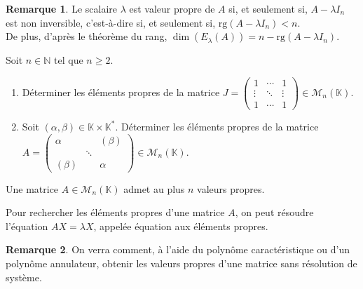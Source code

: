 \documentclass[french]{article}
\newcommand{\N}{\mathbb{N}}
\newcommand{\K}{\mathbb{K}}
\newcommand{\st}{^*}
\newcommand{\rg}{\text{rg}}
\theoremstyle{plain}
\theoremstyle{definition}
\newtheorem*{rmq}{Remarque}
\theoremstyle{remark}
\begin{document}
	\begin{rmq}
		Le scalaire $\lambda$ est valeur propre de $A$ si, et seulement si, $A-\lambda I_n$ est non inversible, c'est-à-dire si, et seulement si, $\rg(A-\lambda I_n)<n$.\\
		De plus, d'après le théorème du rang, $\dim(E_\lambda(A))=n-\rg(A-\lambda I_n)$.
	\end{rmq}
	
	\begin{exo}
		Soit $n\in\N$ tel que $n\geqslant 2$.
		\begin{enumerate}
			\item Déterminer les éléments propres de la matrice $J=\displaystyle\begin{pmatrix}
				1&\cdots&1\\
				\vdots&\ddots&\vdots\\
				1&\cdots&1
			\end{pmatrix}\in\mathcal{M}_n(\K)$.
			\item Soit $(\alpha,\beta)\in\K\times\K\st$. Déterminer les éléments propres de la matrice $A=\displaystyle\begin{pmatrix}
				\alpha&&(\beta)\\
				&\ddots&\\
				(\beta)&&\alpha
			\end{pmatrix}\in\mathcal{M}_n(\K)$.
		\end{enumerate}
	\end{exo}
	
	\begin{cor}%
		Une matrice $A\in\mathcal{M}_n(\K)$ admet au plus $n$ valeurs propres.
	\end{cor}
	
	\begin{met}
		Pour rechercher les éléments propres d'une matrice $A$, on peut résoudre l'équation $AX=\lambda X$, appelée équation aux éléments propres.
	\end{met}
	
	\begin{rmq}
		On verra comment, à l'aide du polynôme caractéristique ou d'un polynôme annulateur, obtenir les valeurs propres d'une matrice sans résolution de système.
	\end{rmq}
	
\end{document}
